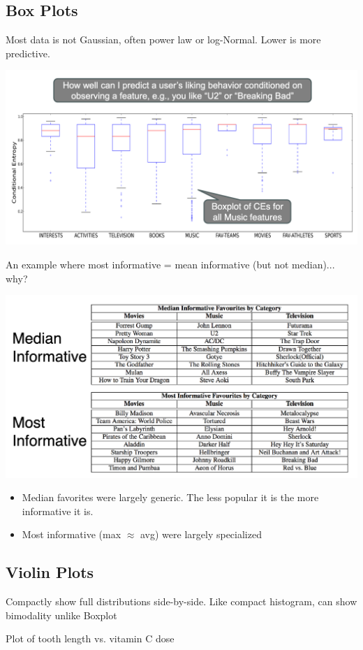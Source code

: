 \documentclass[11pt]{article}
\theoremstyle{definition}
\begin{document}
\subsection{Box Plots}
Most data is not Gaussian, often power law or log-Normal. Lower is more predictive.

\includegraphics[width=\textwidth]{21.png}

An example where most informative = mean
informative (but not median)... why?

\includegraphics[width=\textwidth]{22.png}
\begin{itemize}
  \item Median favorites were largely generic. The less popular it is the more informative it is.
  \item Most informative (max $\approx$ avg) were largely specialized
\end{itemize}
\subsection{Violin Plots}
Compactly show full distributions side-by-side. Like compact histogram, can show bimodality unlike Boxplot

Plot of tooth length vs. vitamin C dose
\end{document}
